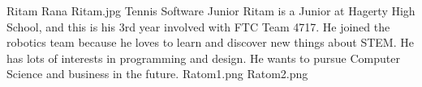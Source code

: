 \insertbio
{Ritam Rana}
{Ritam.jpg}
{Tennis}
{Software}
{Junior}
{
Ritam is a Junior at Hagerty High School, and this is his 3rd year involved with FTC Team 4717. He joined the robotics team because he loves to learn and discover new things about STEM. He has lots of interests in programming and design. He wants to pursue Computer Science and business in the future.
}
{Ratom1.png}
{Ratom2.png}
